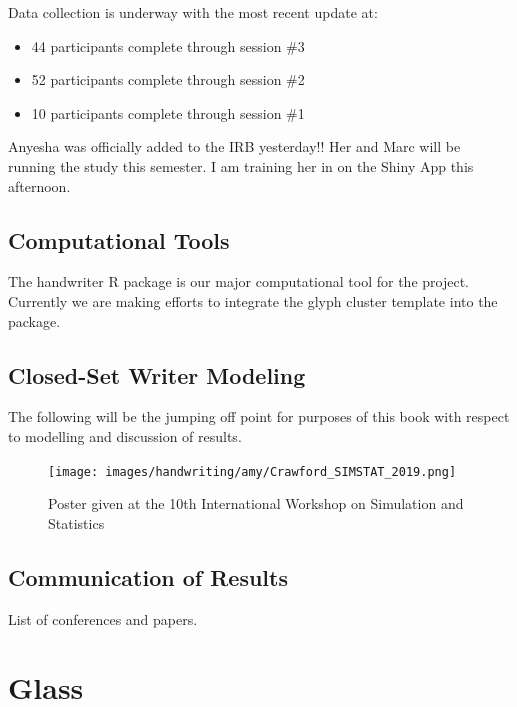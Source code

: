 \documentclass[]{book}
\providecommand{\tightlist}{%
  \setlength{\itemsep}{0pt}\setlength{\parskip}{0pt}}
\begin{document}
Data collection is underway with the most recent update at:

\begin{itemize}
\tightlist
\item
  44 participants complete through session \#3
\item
  52 participants complete through session \#2
\item
  10 participants complete through session \#1
\end{itemize}

Anyesha was officially added to the IRB yesterday!! Her and Marc will be running the study this semester. I am training her in on the Shiny App this afternoon.

\hypertarget{computational-tools-1}{%
\section{Computational Tools}\label{computational-tools-1}}

The handwriter R package is our major computational tool for the project. Currently we are making efforts to integrate the glyph cluster template into the package.

\hypertarget{closed-set-writer-modeling}{%
\section{Closed-Set Writer Modeling}\label{closed-set-writer-modeling}}

The following will be the jumping off point for purposes of this book with respect to modelling and discussion of results.

\begin{figure}
\centering
\texttt{[image: images/handwriting/amy/Crawford\_SIMSTAT\_2019.png]}
\caption{Poster given at the 10th International Workshop on Simulation and Statistics}
\end{figure}

\hypertarget{communication-of-results}{%
\section{Communication of Results}\label{communication-of-results}}

List of conferences and papers.

\hypertarget{glass}{%
\chapter{Glass}\label{glass}}
\end{document}
